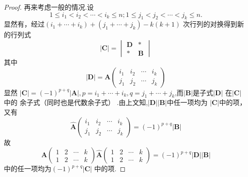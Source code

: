 {\begin{proof}
        再来考虑一般的情况.设
        \[
            1\leqslant i_1<i_2<\cdots <i_k\leqslant n;
            1\leqslant j_1<j_2<\cdots <j_k\leqslant n.
        \]
        显然有，经过$\left(
            i_1+\cdots+i_k
            \right)+\left(j_1+\cdots+j_k\right)
            -k\left(k+1\right)$
        次行列的对换得到新的行列式
        \[
            \left|\bm{C}\right|
            =
            \begin{vmatrix}
                \bm{D} & *      \\
                *      & \bm{B}
            \end{vmatrix}
        \]
        其中
        \[
            \left|\bm{D}\right|
            =\bm{A}
            \begin{pmatrix}
                i_1 & i_2 & \cdots & i_k \\
                j_1 & j_2 & \cdots & j_k
            \end{pmatrix}
        \]
        显然
        $\left|\bm{C}\right|
            =\left(-1\right)^{p+q}
            \left|\bm{A}\right|,p=
            i_1+\cdots+i_k,q=
            j_1+\cdots+j_k$,而$\left|\bm{B}
            \right|$是子式$\left|\bm{D}\right|$
        在$\left|\bm{C}\right|$中的
        余子式（同时也是代数余子式）
        .由上文知,$\left|\bm{D}\right|
            \left|\bm{B}\right|$中任一项均为
        $\left|\bm{C}\right|$中的项，又有
        \[
            \widehat{\bm{A}}
            \begin{pmatrix}
                i_1 & i_2 & \cdots & i_k \\
                j_1 & j_2 & \cdots & j_k
            \end{pmatrix}
            =
            \left(-1\right)^{p+q}\left|\bm{B}
            \right|
        \]
        故
        \[
            \bm{A}\begin{pmatrix}
                1 & 2 & \cdots & k \\
                1 & 2 & \cdots & k
            \end{pmatrix}
            \widehat{\bm{A}}
            \begin{pmatrix}
                1 & 2 & \cdots & k \\
                1 & 2 & \cdots & k
            \end{pmatrix}
            =\left(-1\right)^{p+q}
            \left|\bm{D}\right|
            \left|\bm{B}\right|
        \]
        中的任一项均为$\left(-1\right)
            ^{p+q}\left|\bm{C}\right|$
        中的项.
    \end{proof}
}
